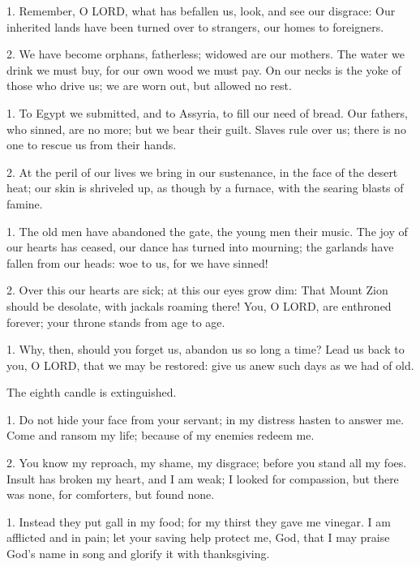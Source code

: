 
1. Remember, O LORD, what has befallen us, look, and see our disgrace: Our
inherited lands have been turned over to strangers, our homes to foreigners.

2. We have become orphans, fatherless; widowed are our mothers. The water we
drink we must buy, for our own wood we must pay. On our necks is the yoke of
those who drive us; we are worn out, but allowed no rest.

1. To Egypt we submitted, and to Assyria, to fill our need of bread. Our
fathers, who sinned, are no more; but we bear their guilt. Slaves rule over us;
there is no one to rescue us from their hands.

2. At the peril of our lives we bring in our sustenance, in the face of the
desert heat; our skin is shriveled up, as though by a furnace, with the searing
blasts of famine.

1. The old men have abandoned the gate, the young men their music. The joy of
our hearts has ceased, our dance has turned into mourning; the garlands have
fallen from our heads: woe to us, for we have sinned!

2. Over this our hearts are sick; at this our eyes grow dim: That Mount Zion
should be desolate, with jackals roaming there! You, O LORD, are enthroned
forever; your throne stands from age to age.

1. Why, then, should you forget us, abandon us so long a time? Lead us back to
you, O LORD, that we may be restored: give us anew such days as we had of old.



\begin{rubric}
  The eighth candle is extinguished.
\end{rubric}




1. Do not hide your face from your servant; in my distress hasten to answer me.
Come and ransom my life; because of my enemies redeem me.

2. You know my reproach, my shame, my disgrace; before you stand all my foes.
Insult has broken my heart, and I am weak; I looked for compassion, but there
was none, for comforters, but found none.

1. Instead they put gall in my food; for my thirst they gave me vinegar. I am
afflicted and in pain; let your saving help protect me, God, that I may praise
God's name in song and glorify it with thanksgiving.

